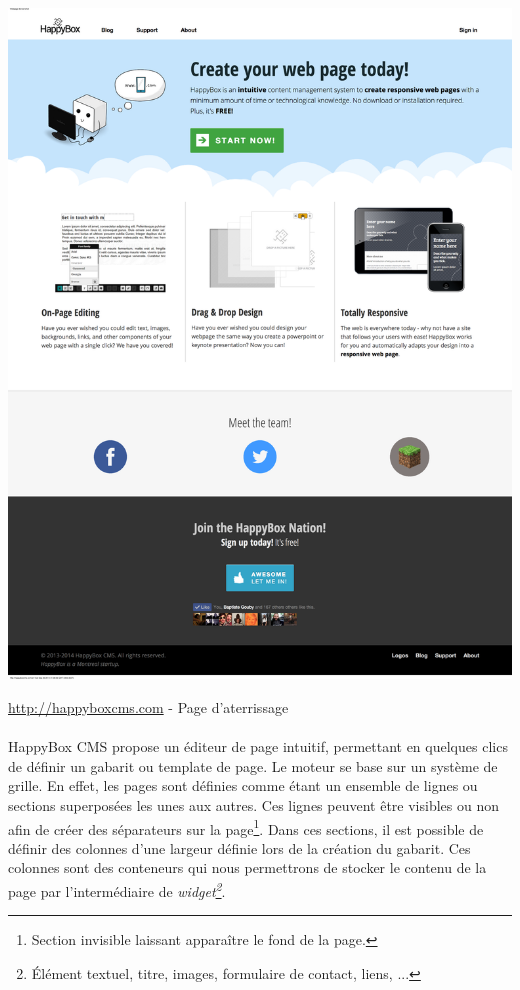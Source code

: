 \documentclass[11pt, a4paper ]{article}
\begin{document}
\begin{spacing}{1.5}
\begin{center}
		\includegraphics[width=\textwidth]{images/HBscreen/fullLanding.png}
		\caption{\url{http://happyboxcms.com} - Page d'aterrissage}
\end{center}

\paragraph{}
HappyBox CMS propose un éditeur de page intuitif, permettant en quelques clics de définir un gabarit ou template de page. Le moteur se base sur un système de grille. En effet, les pages sont définies comme étant un ensemble de lignes ou sections superposées les unes aux autres. Ces lignes peuvent être visibles ou non afin de créer des séparateurs sur la page\footnote{Section invisible laissant apparaître le fond de la page.}. Dans ces sections, il est possible de définir des colonnes d'une largeur définie lors de la création du gabarit. Ces colonnes sont des conteneurs qui nous permettrons de stocker le contenu de la page par l'intermédiaire de \emph{widget\footnote{Élément textuel, titre, images, formulaire de contact, liens, ...}}.


\end{spacing}
\end{document}
